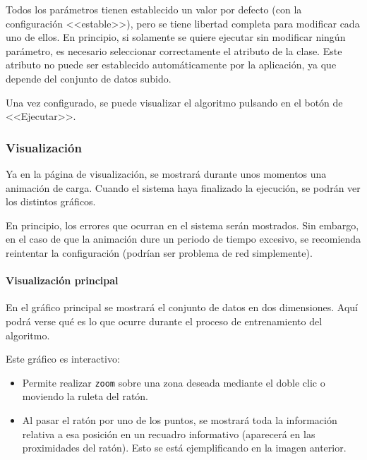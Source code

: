 Todos los parámetros tienen establecido un valor por defecto (con la
configuración <<estable>>), pero se tiene libertad completa para modificar cada
uno de ellos. En principio, si solamente se quiere ejecutar sin modificar ningún
parámetro, es necesario seleccionar correctamente el atributo de la clase.
Este atributo no puede ser establecido automáticamente por la aplicación, ya que
depende del conjunto de datos subido. 

Una vez configurado, se puede visualizar el algoritmo pulsando en el botón de
<<Ejecutar>>.

\subsubsection{Visualización}
\label{mu:visualizacion}
Ya en la página de visualización, se mostrará durante unos momentos una
animación de carga. Cuando el sistema haya finalizado la ejecución, se podrán
ver los distintos gráficos.

En principio, los errores que ocurran en el sistema serán mostrados. Sin
embargo, en el caso de que la animación dure un periodo de tiempo excesivo, se
recomienda reintentar la configuración (podrían ser problema de red
simplemente).


\paragraph{Visualización principal} En el gráfico principal se mostrará el
conjunto de datos en dos dimensiones. Aquí podrá verse qué es lo que ocurre
durante el proceso de entrenamiento del algoritmo.


Este gráfico es interactivo:
\begin{itemize}
    \item Permite realizar \texttt{zoom} sobre una zona deseada mediante el
    doble clic o moviendo la ruleta del ratón.
    \item Al pasar el ratón por uno de los puntos, se mostrará toda la
    información relativa a esa posición en un recuadro informativo (aparecerá en
    las proximidades del ratón). Esto se está ejemplificando en la imagen
    anterior.
\end{itemize}


